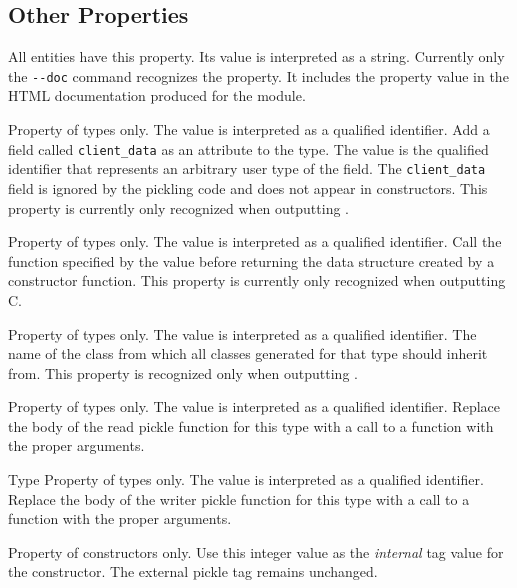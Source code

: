 \subsection{Other Properties}
\begin{description}
    All entities have this property. Its value is interpreted as a
    string. Currently only the \lstinline!--doc! command recognizes the
    property. It includes the property value in the HTML documentation
    produced for the module.

    Property of types only.	The value is interpreted as a qualified 
    identifier. Add a field called \lstinline!client_data! as an
    attribute to the type. The value is the qualified identifier that
    represents an arbitrary user type of the field. The \lstinline!client_data!
    field is ignored by the pickling code and does not appear in
    constructors. This property is currently only recognized when
    outputting \Cplusplus{}.

    Property of types only. The value is interpreted as a qualified
    identifier. Call the function specified by the value before
    returning the data structure created by a constructor function.
    This property is currently only recognized when outputting C.

    Property of types only. The value is interpreted as a qualified
    identifier. The name of the class from which all classes generated
    for that type should inherit from. This property is recognized only
    when outputting \Cplusplus{}.
    
   Property of types only. The value is interpreted as a qualified
   identifier.  Replace the body of the read pickle function for this
   type with a call to a function with the proper arguments. 

  Type
   Property of types only. The value is interpreted as a qualified
   identifier.  Replace the body of the writer pickle function for this
   type with a call to a function with the proper arguments. 

   Property of constructors only.
   Use this integer value as the \emph{internal} tag value for the
   constructor. The external pickle tag remains unchanged. 

\end{description}%
